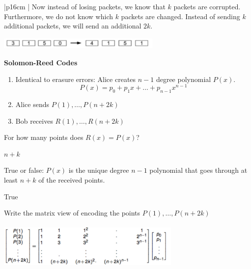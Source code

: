 {\tabulinesep=1mm
\begin{tabu}{|p{16cm} |}
\hline
Now instead of losing packets, we know that $k$ packets are corrupted. 
Furthermore, we do not know which $k$ packets are changed. Instead of 
sending $k$ additional packets, we will send an additional $2k$.\newline
\begin{center}
\includegraphics[width=8cm, height=0.6cm]{general_intro.jpg}
\end{center}

\textbf{Solomon-Reed Codes}
\begin{enumerate}
\item Identical to erasure errors: Alice creates $n - 1$ degree polynomial 
$P(x)$.\newline
\[P(x) = p_0 + p_1x + \dotsc + p_{n-1}x^{n-1} \]
\item Alice sends $P(1), \dotsc, P(n + 2k)$ \\
\item Bob receives $R(1), \dotsc, R(n + 2k) $ \newline
\end{enumerate}

For how many points does $R(x) = P(x)$? \newline
\begin{solution}
$ n + k$
\end{solution}

True or false: $P(x)$ is the unique degree $n - 1$ polynomial that goes 
through at least $n + k$ of the received points.\newline
\begin{solution}
True
\end{solution}

Write the matrix view of encoding the points $P(1), \dotsc, P(n + 2k)$
\begin{solution}[1cm]
\begin{center}
\includegraphics[width=9cm, height=2.3cm]{general_intro_matrix.jpg}
\end{center}
\end{solution}

\\
\hline
\end{tabu}
}

